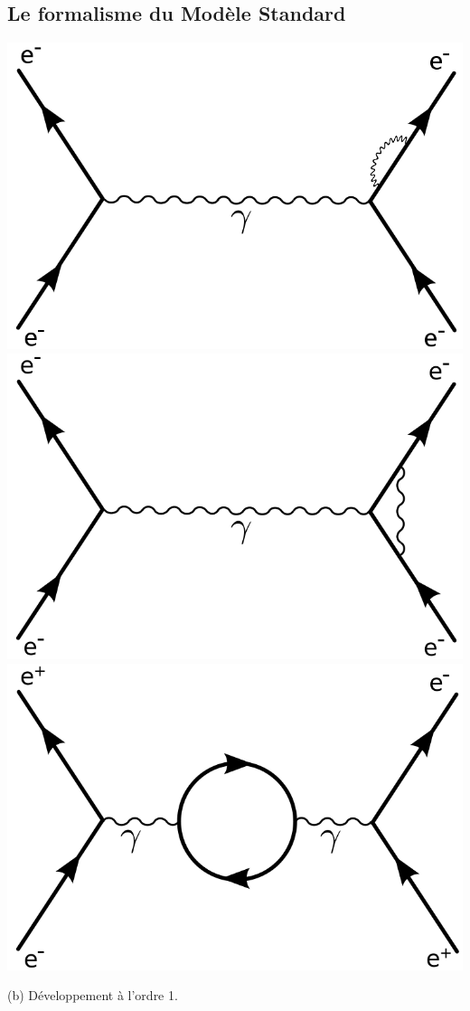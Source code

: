 \subsection{Le formalisme du Modèle Standard}
\marginpar
{
\centering
\includegraphics[width=\marginparwidth]{SM/feyn1.png}
\includegraphics[width=\marginparwidth]{SM/feyn2.png}
\includegraphics[width=\marginparwidth]{SM/feyn3.png}
\begin{center}\normalfont\small {(b) Développement à l'ordre 1.}\end{center}
\label{feyn}
}
